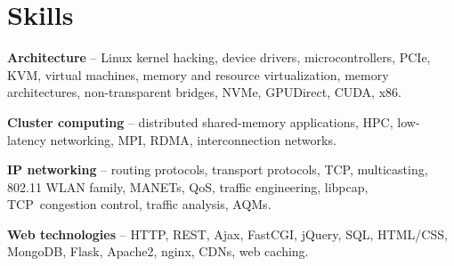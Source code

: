 
\section{Skills}
\begin{small}
	\parbox[t][][t]{\linewidth}{
		\textbf{Architecture} -- {Linux kernel hacking, device drivers,
		microcontrollers,
		PCIe, KVM, virtual machines, memory and resource virtualization,
		memory architectures, non-transparent bridges, 
		NVMe, GPUDirect, CUDA, x86.}
		\bigbreak
	}
	\parbox[t][][t]{\linewidth}{
		\textbf{Cluster computing} -- {distributed shared-memory applications, HPC, low-latency
		networking, MPI, RDMA, interconnection networks.}
		\bigbreak
	}
	\parbox[t][][t]{\linewidth}{
		\textbf{IP networking} -- {routing protocols, transport protocols, TCP,
		multicasting, 802.11 WLAN family, MANETs, QoS, 
		traffic engineering, libpcap, TCP~congestion control, traffic
		analysis, AQMs.}
		\bigbreak
	}
	\parbox[t][][t]{\linewidth}{
		\textbf{Web technologies} -- {HTTP, REST, Ajax, FastCGI, jQuery, 
		SQL, HTML/CSS, MongoDB, Flask, Apache2, nginx, CDNs, web caching.}
		\bigbreak
	}
\end{small}
